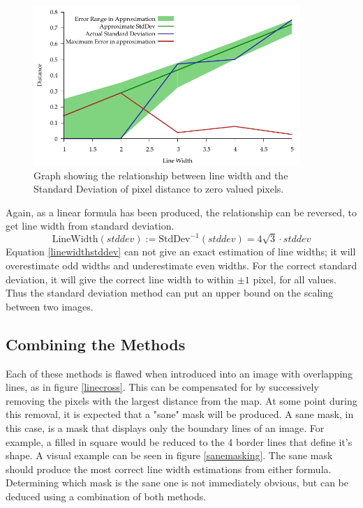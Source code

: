 \documentclass[../main.tex]{subfiles}
\begin{document}
    \begin{figure}[H]
      \centering
      \includegraphics[width=0.9\textwidth]{graphs/stddevwidth.pdf}
      \caption{Graph showing the relationship between line width and the Standard Deviation of pixel distance to zero valued pixels.}
      \label{stddevwidth}
    \end{figure}

    Again, as a linear formula has been produced, the relationship can be reversed, to get line width from standard deviation.
    \begin{equation}
      \text{LineWidth}(stddev) := \text{StdDev}^{-1}(stddev) = 4\sqrt{3}\cdot stddev
      \label{linewidthstddev}
    \end{equation}
    Equation \ref{linewidthstddev} can not give an exact estimation of line widths; it will overestimate odd widths and underestimate even widths.
    For the correct standard deviation, it will give the correct line width to within $\pm1$ pixel, for all values.
    Thus the standard deviation method can put an upper bound on the scaling between two images.

  \subsection{Combining the Methods}
    Each of these methods is flawed when introduced into an image with overlapping lines, as in figure \ref{linecross}.
    This can be compensated for by successively removing the pixels with the largest distance from the map. %
    At some point during this removal, it is expected that a "sane" mask will be produced.
    A sane mask, in this case, is a mask that displays only the boundary lines of an image.
    For example, a filled in square would be reduced to the 4 border lines that define it's shape.
    A visual example can be seen in figure \ref{sanemasking}.
    The sane mask should produce the most correct line width estimations from either formula.
    Determining which mask is the sane one is not immediately obvious, but can be deduced using a combination of both methods.
\end{document}
